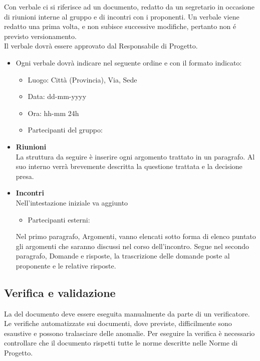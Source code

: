 	\label{verbale}
	Con verbale ci si riferisce ad un documento, redatto da un segretario in occasione  di riunioni interne al gruppo e di incontri con i proponenti. Un verbale viene redatto una prima volta, e non subisce successive modifiche, pertanto non é previsto versionamento. \\
	Il verbale dovrà essere approvato dal Responsabile di Progetto.
	\begin{itemize}
	\item Ogni verbale dovrà indicare nel seguente ordine e con il formato indicato:
	
	
	\begin{itemize}
	\item Luogo: Città (Provincia), Via, Sede
	\item Data: dd-mm-yyyy
	\item Ora: hh-mm 24h
	\item Partecipanti del gruppo:
	\end{itemize}
	
	\item \textbf{Riunioni} \\
	La struttura da seguire è inserire ogni argomento trattato in un paragrafo. Al suo interno verrà brevemente descritta la questione trattata e la decisione presa.
	
	\item \textbf{Incontri} \\
	Nell'intestazione iniziale va aggiunto
	\begin{itemize}
	\item Partecipanti esterni:
	\end{itemize}
	Nel primo paragrafo, Argomenti, vanno elencati sotto forma di elenco puntato gli argomenti che saranno discussi nel corso dell'incontro. Segue nel secondo paragrafo, Domande e risposte, la trascrizione delle domande poste al proponente e le relative risposte.
	\end{itemize}
	
\subsection{Verifica e validazione}

La \textbf{} del documento deve essere eseguita manualmente da parte di un verificatore. Le verifiche automatizzate sui documenti, dove previste, difficilmente sono esaustive e possono tralasciare delle anomalie. Per eseguire la verifica è necessario controllare che il documento rispetti tutte le norme descritte nelle Norme di Progetto.

